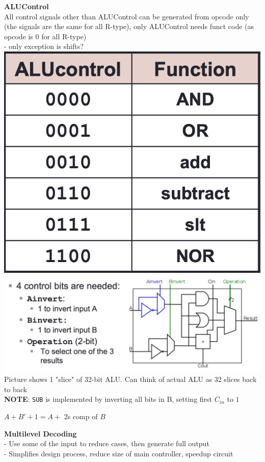 \documentclass[10pt, a4paper]{article}
\newcommand{\highlight}[1]{{\color{red}\textbf{#1}}}
\begin{document}
\begin{multicols*}{3}
		\textbf{ALUControl}\\
		All control signals other than ALUControl can be generated from opcode only (the signals are the same for all R-type), only ALUControl needs funct code (as opcode is 0 for all R-type)\\
		- only exception is shifts?\\
		\includegraphics[scale=0.25]{./assets/ALUControl}\\
		\includegraphics[scale=0.25]{./assets/ALUCircuit}\\
		Picture shows 1 "slice" of 32-bit ALU. Can think of actual ALU as 32 slices back to back\\
		\highlight{NOTE}: \texttt{SUB} is implemented by inverting all bits in B, setting first $C_{in}$ to $1$
		
		\centerline{$A + B' + 1 = A +$ 2s comp of $B$}
		
		\textbf{Multilevel Decoding}\\
		- Use some of the input to reduce cases, then generate full output\\
		- Simplifies design process, reduce size of main controller, speedup circuit\\
		

\end{multicols*}
\end{document}
